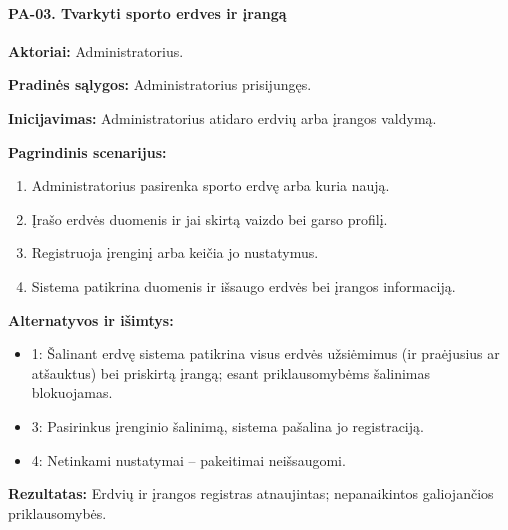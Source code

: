 \paragraph{PA-03. Tvarkyti sporto erdves ir įrangą}\mbox{}\par
\textbf{Aktoriai:} Administratorius.\par
\textbf{Pradinės sąlygos:} Administratorius prisijungęs.\par
\textbf{Inicijavimas:} Administratorius atidaro erdvių arba įrangos valdymą.\par
\textbf{Pagrindinis scenarijus:}
\begin{enumerate}
\item Administratorius pasirenka sporto erdvę arba kuria naują.
\item Įrašo erdvės duomenis ir jai skirtą vaizdo bei garso profilį.
\item Registruoja įrenginį arba keičia jo nustatymus.
\item Sistema patikrina duomenis ir išsaugo erdvės bei įrangos informaciją.
\end{enumerate}
\textbf{Alternatyvos ir išimtys:}
\begin{itemize}
\item 1: Šalinant erdvę sistema patikrina visus erdvės užsiėmimus (ir praėjusius ar atšauktus) bei priskirtą įrangą; esant priklausomybėms šalinimas blokuojamas.
\item 3: Pasirinkus įrenginio šalinimą, sistema pašalina jo registraciją.
\item 4: Netinkami nustatymai -- pakeitimai neišsaugomi.
\end{itemize}
\textbf{Rezultatas:} Erdvių ir įrangos registras atnaujintas; nepanaikintos galiojančios priklausomybės.\par
{}
